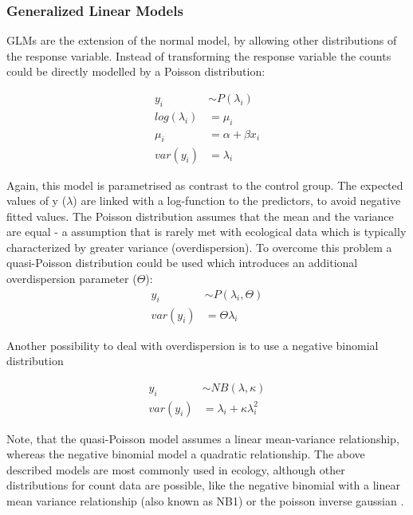 \documentclass{scrartcl}
\begin{document}
\subsubsection{Generalized Linear Models}
GLMs are the extension of the normal model, by allowing other distributions of the response variable.
Instead of transforming the response variable the counts could be directly modelled by a Poisson distribution:

\begin{align}
  y_i &\sim P(\lambda_i) \nonumber \\
  log(\lambda_i) &= \mu_i \label{eqn:pois} \\
  \mu_i &= \alpha + \beta x_i \nonumber \\
  var(y_i) &= \lambda_i \nonumber
\end{align}

Again, this model is parametrised as contrast to the control group. 
The expected values of y ($\lambda$) are linked with a log-function to the predictors, to avoid negative fitted values. 
The Poisson distribution assumes that the mean and the variance are equal - a assumption that is rarely met with ecological data which is typically characterized by greater variance (overdispersion).
To overcome this problem a quasi-Poisson distribution could be used which introduces an additional overdispersion parameter ($\Theta$):
\begin{align}
  y_i &\sim P(\lambda_i, \Theta) \label{eqn:quasi} \\
  var(y_i) &= \Theta \lambda_i  \nonumber
\end{align}

Another possibility to deal with overdispersion is to use a negative binomial distribution

\begin{align}
  y_i &\sim NB(\lambda, \kappa) \label{eqn:negbin}  \\
  var(y_i) &= \lambda_i + \kappa \lambda_i^2 \nonumber
\end{align}

Note, that the quasi-Poisson model assumes a linear mean-variance relationship, whereas the negative binomial model a quadratic relationship.
The above described models are most commonly used in ecology, although other distributions for count data are possible, like the negative binomial with a linear mean variance relationship (also known as NB1) or the poisson inverse gaussian \citep{hilbe_modeling_2014}.
\end{document}

